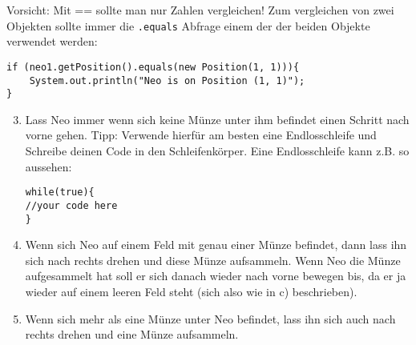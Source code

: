 \begin{Infobox}[\lstinline{==} und \lstinline{.equals()}]
	Vorsicht: Mit == sollte man nur Zahlen vergleichen! 
	Zum vergleichen von zwei Objekten sollte immer die \lstinline{.equals} Abfrage einem der der beiden Objekte verwendet werden:

	\begin{lstlisting}
if (neo1.getPosition().equals(new Position(1, 1))){
	System.out.println("Neo is on Position (1, 1)");
}
	\end{lstlisting}

\end{Infobox}


\begin{enumerate}\setcounter{enumi}{2}
	\item
		Lass Neo immer wenn sich keine Münze unter ihm befindet einen Schritt nach vorne gehen.
		Tipp: Verwende hierfür am besten eine Endlosschleife und Schreibe deinen Code in den Schleifenkörper.
		Eine Endlosschleife kann z.B. so aussehen:
	\begin{lstlisting}
while(true){
//your code here
}
	\end{lstlisting}

	\item
		Wenn sich Neo auf einem Feld mit genau einer Münze befindet, dann lass ihn sich nach rechts drehen und diese Münze aufsammeln. 
		Wenn Neo die Münze aufgesammelt hat soll er sich danach wieder nach vorne bewegen bis, da er ja wieder auf einem leeren Feld steht (sich also wie in c) beschrieben).

	\item
		Wenn sich mehr als eine Münze unter Neo befindet, lass ihn sich auch nach rechts drehen und eine Münze aufsammeln.
\end{enumerate}


